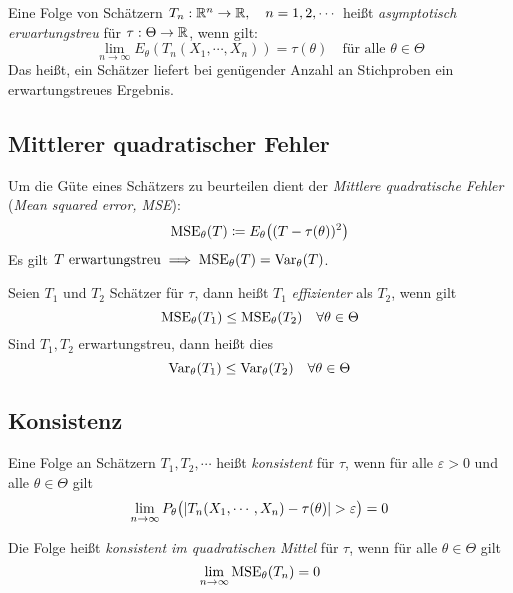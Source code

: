 			Eine Folge von Schätzern \( T_n : \mathbb{R}^n \rightarrow \mathbb{R}, \quad n = 1, 2, \cdots \) heißt \textit{asymptotisch erwartungstreu} für \( \tau : \Theta \rightarrow \mathbb{R} \), wenn gilt:
			\begin{equation*}
				\lim\limits_{n \rightarrow \infty} E_\theta(T_n(X_1, \cdots, X_n)) = \tau(\theta) \quad \textrm{für alle } \theta \in \Theta
			\end{equation*}
			Das heißt, ein Schätzer liefert bei genügender Anzahl an Stichproben ein erwartungstreues Ergebnis.

		\subsection{Mittlerer quadratischer Fehler}
			Um die Güte eines Schätzers zu beurteilen dient der \textit{Mittlere quadratische Fehler} (\textit{Mean squared error, MSE}):
			\begin{eqnarray}
				\operatorname{MSE}_\theta(T) \coloneqq E_\theta\big((T - \tau(\theta))^2\big)
			\end{eqnarray}
			Es gilt \( T \textrm{ erwartungstreu} \implies \operatorname{MSE}_\theta(T) = \operatorname{Var}_\theta(T) \).

			Seien \( T_1 \) und \(T_2\) Schätzer für \(\tau\), dann heißt \(T_1\) \textit{effizienter} als \(T_2\), wenn gilt
			\begin{equation*}
				\operatorname{MSE}_\theta(T_1) \leq \operatorname{MSE}_\theta(T_2) \quad \forall \theta \in \Theta
			\end{equation*}
			Sind \( T_1, T_2 \) erwartungstreu, dann heißt dies
			\begin{equation*}
				\operatorname{Var}_\theta(T_1) \leq \operatorname{Var}_\theta(T_2) \quad \forall \theta \in \Theta
			\end{equation*}

		\subsection{Konsistenz}
			Eine Folge an Schätzern \( T_1, T_2, \cdots \) heißt \textit{konsistent} für \(\tau\), wenn für alle \(\varepsilon > 0\) und alle \(\theta \in \Theta\) gilt
			\begin{equation*}
				\lim\limits_{n \rightarrow \infty} P_\theta\big( \abs{T_n(X_1, \cdots, X_n) - \tau(\theta)} > \varepsilon \big) = 0
			\end{equation*}

			Die Folge heißt \textit{konsistent im quadratischen Mittel} für \(\tau\), wenn für alle \(\theta \in \Theta\) gilt
			\begin{equation*}
				\lim\limits_{n \rightarrow \infty} \operatorname{MSE}_\theta(T_n) = 0
			\end{equation*}

